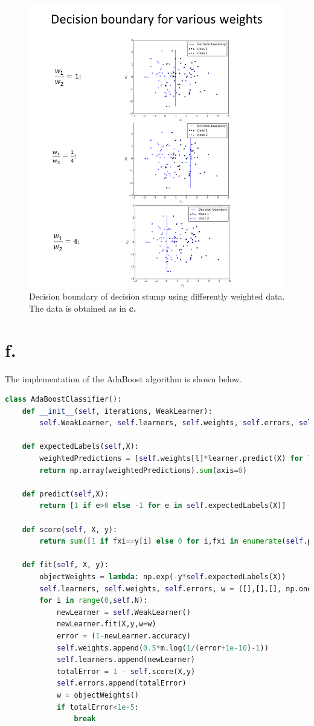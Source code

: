 \documentclass [a4paper] {report}
\begin{document}
	\begin{figure}[H]
		\includegraphics[width = \textwidth]{Images/weights.png}
		\caption{Decision boundary of decision stump using differently weighted data. The data is obtained as in \textbf{c.}}
		\label{weights}
	\end{figure}
	\newpage
	\section*{f.}
	The implementation of the AdaBoost algorithm is shown below.
	
	\begin{lstlisting}[language=python, frame=l, basicstyle=\ttfamily\scriptsize]		
class AdaBoostClassifier():
	def __init__(self, iterations, WeakLearner):
		self.WeakLearner, self.learners, self.weights, self.errors, self.N = WeakLearner, [], [], [], iterations
	
	def expectedLabels(self,X):
		weightedPredictions = [self.weights[l]*learner.predict(X) for l,learner in enumerate(self.learners)]
		return np.array(weightedPredictions).sum(axis=0)
	
	def predict(self,X):
		return [1 if e>0 else -1 for e in self.expectedLabels(X)]
	
	def score(self, X, y):
		return sum([1 if fxi==y[i] else 0 for i,fxi in enumerate(self.predict(X))])/y.shape[0] 
	
	def fit(self, X, y):
		objectWeights = lambda: np.exp(-y*self.expectedLabels(X))
		self.learners, self.weights, self.errors, w = ([],[],[], np.ones(X.shape[0]))
		for i in range(0,self.N):
			newLearner = self.WeakLearner()
			newLearner.fit(X,y,w=w)
			error = (1-newLearner.accuracy)
			self.weights.append(0.5*m.log(1/(error+1e-10)-1))
			self.learners.append(newLearner)
			totalError = 1 - self.score(X,y)
			self.errors.append(totalError)
			w = objectWeights()
			if totalError<1e-5:
				break
	\end{lstlisting}
	
\end{document}
